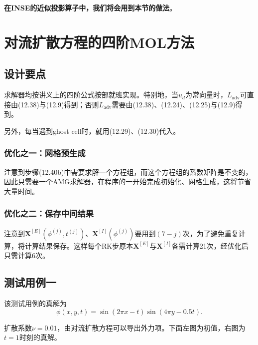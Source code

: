\documentclass[lang=cn,10pt,bibend=bibtex]{elegantbook}
\begin{document}
\textbf{在INSE的近似投影算子中，我们将会用到本节的做法}。

\newpage

\chapter{对流扩散方程的四阶MOL方法}

\section{设计要点}

求解器均按讲义上的四阶公式按部就班实现。特别地，当$u_d$为常向量时，$L_{\text{adv}}$可直接由(12.38)与(12.9)得到；否则$L_{\text{adv}}$需要由(12.38)、(12.24)、(12.25)与(12.9)得到。

另外，每当遇到ghost cell时，就用(12.29)、(12.30)代入。

\subsection{优化之一：网格预生成}

注意到步骤(12.40b)中需要求解一个方程组，而这个方程组的系数矩阵是不变的，因此只需要一个AMG求解器，在程序的一开始完成初始化、网格生成，这将节省大量时间。

\subsection{优化之二：保存中间结果}

注意到$\mathbf{X}^{[E]}(\phi^{(j)},t^{(j)})$、$\mathbf{X}^{[I]}(\phi^{(j)})$要用到$(7-j)$次，为了避免重复计算，将计算结果保存。这样每个RK步原本$\mathbf{X}^{[E]}$与$\mathbf{X}^{[I]}$各需计算21次，经优化后只需计算6次。

\section{测试用例一}

该测试用例的真解为
\begin{equation*}
  \phi(x,y,t)=\sin(2\pi x-t)\sin(4\pi y-0.5t).
\end{equation*}

扩散系数$\nu=0.01$，由对流扩散方程可以导出外力项。下面左图为初值，右图为$t=1$时刻的真解。
\end{document}
